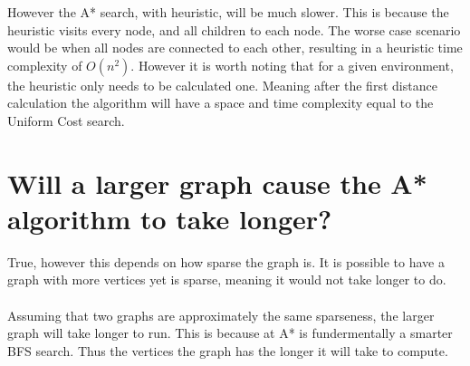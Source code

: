 \documentclass[12pt]{article}
\begin{document}
    However the A* search, with heuristic, will be much slower. This is because the heuristic visits every node, and all children to each node. The worse case scenario would be when all nodes are connected to each other, resulting in a heuristic time complexity of $O(n^2)$. However it is worth noting that for a given environment, the heuristic only needs to be calculated one. Meaning after the first distance calculation the algorithm will have a space and time complexity equal to the Uniform Cost search.

    \section{Will a larger graph cause the A* algorithm to take longer?}

    True, however this depends on how sparse the graph is. It is possible to have a graph with more vertices yet is sparse, meaning it would not take longer to do.\\
    \\
    Assuming that two graphs are approximately the same sparseness, the larger graph will take longer to run. This is because at A* is fundermentally a smarter BFS search. Thus the vertices the graph has the longer it will take to compute.
\end{document}
